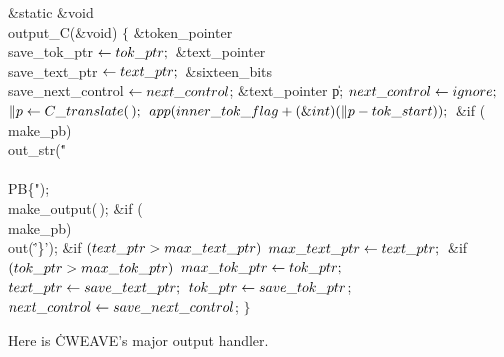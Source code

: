 \Y\B\1\1\&{static} \&{void} \\{output\_C}(\&{void})\2\2\6
${}\{{}$\1\6
\&{token\_pointer} \\{save\_tok\_ptr}${}\leftarrow\\{tok\_ptr};{}$\6
\&{text\_pointer} \\{save\_text\_ptr}${}\leftarrow\\{text\_ptr};{}$\6
\&{sixteen\_bits} \\{save\_next\_control}${}\leftarrow\\{next\_control}{}$;\6
\&{text\_pointer} \|p;\7
${}\\{next\_control}\leftarrow\\{ignore};{}$\6
${}\|p\leftarrow\\{C\_translate}(\,);{}$\6
${}\\{app}(\\{inner\_tok\_flag}+(\&{int})(\|p-\\{tok\_start}));{}$\6
\&{if} (\\{make\_pb})\1\5
\\{out\_str}(\.{"\\\\PB\{"});\2\6
\\{make\_output}(\,);\6
\&{if} (\\{make\_pb})\1\5
\\{out}(\.{'\}'});\2\6
\&{if} ${}(\\{text\_ptr}>\\{max\_text\_ptr}){}$\1\5
${}\\{max\_text\_ptr}\leftarrow\\{text\_ptr};{}$\2\6
\&{if} ${}(\\{tok\_ptr}>\\{max\_tok\_ptr}){}$\1\5
${}\\{max\_tok\_ptr}\leftarrow\\{tok\_ptr};{}$\2\6
${}\\{text\_ptr}\leftarrow\\{save\_text\_ptr};{}$\6
${}\\{tok\_ptr}\leftarrow\\{save\_tok\_ptr}{}$;\6
${}\\{next\_control}\leftarrow\\{save\_next\_control}{}$;\6
\4${}\}{}$\2\par
\fi

Here is \.{CWEAVE}'s major output handler.

